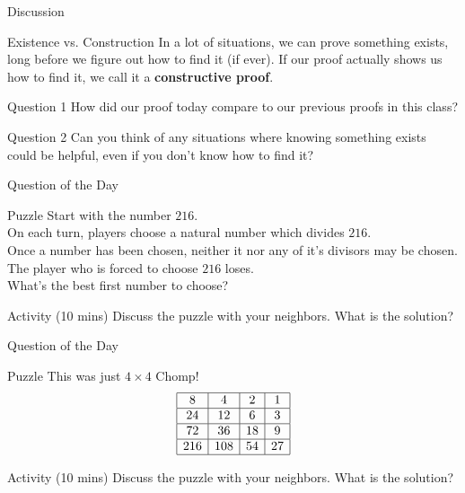 \documentclass{beamer}
\begin{document}
\begin{frame}{Discussion}
\pause
  \begin{block}{Existence vs. Construction}
    In a lot of situations, we can prove something exists, long before we figure out how to find it (if ever).
    If our proof actually shows us how to find it, we call it a \textbf{constructive proof}.
  \end{block}
\pause
  \begin{block}{Question 1}
    How did our proof today compare to our previous proofs in this class?
  \end{block}
\pause
  \begin{block}{Question 2}
    Can you think of any situations where knowing something exists could be helpful, even if you don't know how to find it?
  \end{block}
\end{frame}


\begin{frame}{Question of the Day}
\pause
  \begin{block}{Puzzle}
    Start with the number $216$.\\
    On each turn, players choose a natural number which divides $216$.\\
    Once a number has been chosen, neither it nor any of it's divisors may be chosen.\\
    The player who is forced to choose $216$ loses.\\ What's the best first number to choose?
  \end{block}
\pause
  \begin{block}{Activity (10 mins)}
    Discuss the puzzle with your neighbors.  What is the solution?
  \end{block}
\end{frame}

\begin{frame}{Question of the Day}
\pause
  \begin{block}{Puzzle}
    This was just $4\times 4$ Chomp!
    $$\begin{array}{|c|c|c|c|}\hline
    8 &  4 &  2 & 1\\\hline
   24 & 12 &  6 & 3\\\hline
   72 & 36 & 18 & 9\\\hline
  216 &108 & 54 & 27\\\hline
    \end{array}$$
  \end{block}
\pause
  \begin{block}{Activity (10 mins)}
    Discuss the puzzle with your neighbors.  What is the solution?
  \end{block}
\end{frame}
\end{document}
